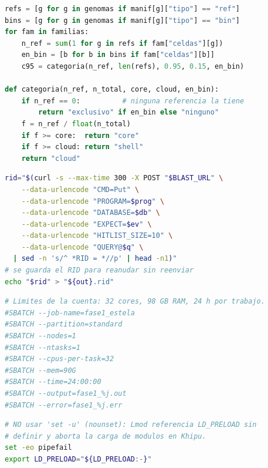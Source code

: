 \begin{lstlisting}[language=Python, caption={Frecuencia de cada familia
calculada solo con las referencias y ubicación del bin (extracto simplificado de
\texttt{07\_particion.py}).}, label={lst:particion}]
refs = [g for g in genomas if manif[g]["tipo"] == "ref"]
bins = [g for g in genomas if manif[g]["tipo"] == "bin"]
for fam in familias:
    n_ref = sum(1 for g in refs if fam["celdas"][g])
    en_bin = [b for b in bins if fam["celdas"][b]]
    c95 = categoria(n_ref, len(refs), 0.95, 0.15, en_bin)

def categoria(n_ref, n_total, core, cloud, en_bin):
    if n_ref == 0:          # ninguna referencia la tiene
        return "exclusivo" if en_bin else "ninguno"
    f = n_ref / float(n_total)
    if f >= core:  return "core"
    if f >= cloud: return "shell"
    return "cloud"
\end{lstlisting}

\begin{lstlisting}[language=bash, caption={Envío de una búsqueda a la interfaz
web de BLAST del NCBI (extracto simplificado de \texttt{08\_exclusivos\_remoto.sh}).},
label={lst:blast_remoto}]
rid="$(curl -s --max-time 300 -X POST "$BLAST_URL" \
    --data-urlencode "CMD=Put" \
    --data-urlencode "PROGRAM=$prog" \
    --data-urlencode "DATABASE=$db" \
    --data-urlencode "EXPECT=$ev" \
    --data-urlencode "HITLIST_SIZE=10" \
    --data-urlencode "QUERY@$q" \
  | sed -n 's/^ *RID = *//p' | head -n1)"
# se guarda el RID para reanudar sin reenviar
echo "$rid" > "${out}.rid"
\end{lstlisting}

\begin{lstlisting}[language=bash, caption={Cabecera de solicitud de recursos a
SLURM (extracto de \texttt{run\_fase1.slurm}).}, label={lst:sbatch}]
# Limites de la cuenta: 32 cores, 98 GB RAM, 24 h por trabajo.
#SBATCH --job-name=fase1_estela
#SBATCH --partition=standard
#SBATCH --nodes=1
#SBATCH --ntasks=1
#SBATCH --cpus-per-task=32
#SBATCH --mem=90G
#SBATCH --time=24:00:00
#SBATCH --output=fase1_%j.out
#SBATCH --error=fase1_%j.err
\end{lstlisting}

\begin{lstlisting}[language=bash, caption={Configuración de terminación ante
error, compatible con el sistema de módulos del clúster (extracto de
\texttt{run\_fase1.slurm}).}, label={lst:robustez}]
# NO usar 'set -u' (nounset): Lmod referencia LD_PRELOAD sin
# definir y aborta la carga de modulos en Khipu.
set -eo pipefail
export LD_PRELOAD="${LD_PRELOAD:-}"
\end{lstlisting}

